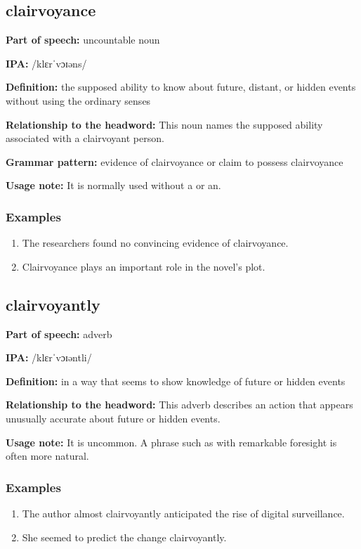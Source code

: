 \documentclass[11pt]{article}
\begin{document}
\subsection{clairvoyance}
\textbf{Part of speech:} uncountable noun

\textbf{IPA:} /klɛrˈvɔɪəns/

\textbf{Definition:} the supposed ability to know about future, distant, or hidden events without using the ordinary senses

\textbf{Relationship to the headword:} This noun names the supposed ability associated with a clairvoyant person.

\textbf{Grammar pattern:} evidence of clairvoyance or claim to possess clairvoyance

\textbf{Usage note:} It is normally used without a or an.

\subsubsection{Examples}
\begin{enumerate}
  \item The researchers found no convincing evidence of clairvoyance.
  \item Clairvoyance plays an important role in the novel's plot.
\end{enumerate}

\subsection{clairvoyantly}
\textbf{Part of speech:} adverb

\textbf{IPA:} /klɛrˈvɔɪəntli/

\textbf{Definition:} in a way that seems to show knowledge of future or hidden events

\textbf{Relationship to the headword:} This adverb describes an action that appears unusually accurate about future or hidden events.

\textbf{Usage note:} It is uncommon. A phrase such as with remarkable foresight is often more natural.

\subsubsection{Examples}
\begin{enumerate}
  \item The author almost clairvoyantly anticipated the rise of digital surveillance.
  \item She seemed to predict the change clairvoyantly.
\end{enumerate}
\end{document}
